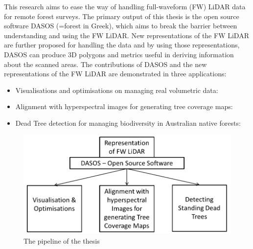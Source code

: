 \documentclass{subfiles}
\begin{document}
	

	
\par This research aims to ease the way of handling full-waveform (FW) LiDAR  data for remote forest surveys. The primary output of this thesis is the open source software DASOS (=forest in Greek), which aims to break the barrier between understanding and using the FW LiDAR. New representations of the FW LiDAR are further proposed for handling the data and by using those representations, DASOS can produce 3D polygons and metrics useful in deriving information about the scanned areas. The contributions of DASOS and the new representations of the FW LiDAR are demonstrated in three applications: 

\begin{itemize}
	\item Visualisations and optimisations on managing real volumetric data:
	
	\item Alignment with hyperspectral images for generating tree coverage maps:
	
	\item Dead Tree detection for managing biodiversity in Australian native forests:
	

\end{itemize}

\begin{figure}
	\includegraphics[width=\textwidth]{tex/Pipeline/Pipeline.png}
	\caption{The pipeline of the thesis}
\end{figure}
\end{document}
